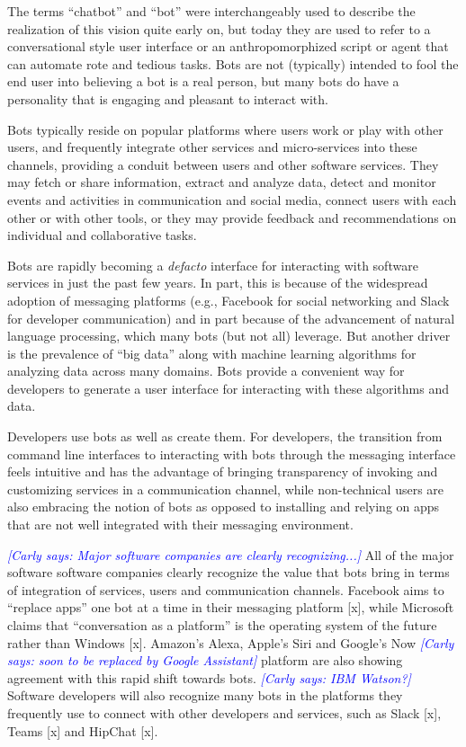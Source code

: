 \documentclass{sig-alternate}
\newcommand{\cl}[1]{\textcolor{blue}{{\it [Carly says: #1]}}}
\begin{document}
The terms ``chatbot'' and ``bot'' were interchangeably used to describe the realization of this vision quite early on, but today they are used to refer to a conversational style user interface or an anthropomorphized script or agent that can automate rote and tedious tasks.
Bots are not (typically) intended to fool the end user into believing a bot is a real person, but many bots do have a personality that is engaging and pleasant to interact with. 
 
Bots typically reside on popular platforms where users work or play with other users, and frequently integrate other services and micro-services into these channels, providing a conduit between users and other software services. 
They may fetch or share information, extract and analyze data, detect and monitor events and activities in communication and social media, connect users with each other or with other tools, or they may provide feedback and recommendations on individual and collaborative tasks. 

Bots are rapidly becoming a \emph{defacto} interface for interacting with software services in just the past few years.  In part, this is because of the widespread adoption of messaging platforms (e.g., Facebook for social networking and Slack for developer communication) and in part because of the advancement of natural language processing, which many bots (but not all) leverage.
But another driver is the prevalence of ``big data'' along with machine learning algorithms for analyzing data across many domains.  Bots provide a convenient way for developers to generate a user interface for interacting with these algorithms and data. 

Developers use bots as well as create them. For developers, the transition from command line interfaces to interacting with bots through the messaging interface feels intuitive and has the advantage of bringing transparency of invoking and customizing services in a communication channel, while non-technical users are also embracing the notion of bots as opposed to installing and relying on apps that are not well integrated with their messaging environment.  

\cl{Major software companies are clearly recognizing...}
All of the major software software companies clearly recognize the value that bots bring in terms of integration of services, users and communication channels. Facebook aims to ``replace apps'' one bot at a time in their messaging platform [x], while Microsoft claims that ``conversation as a platform'' is the operating system of the future rather than Windows [x]. 
Amazon's Alexa, Apple's Siri and Google's Now \cl{soon to be replaced by Google Assistant} platform are also showing agreement with this rapid shift towards bots. \cl{IBM Watson?}
Software developers will also recognize many bots in the platforms they frequently use to connect with other developers and services, such as Slack [x], Teams [x] and HipChat [x]. 
\end{document}
